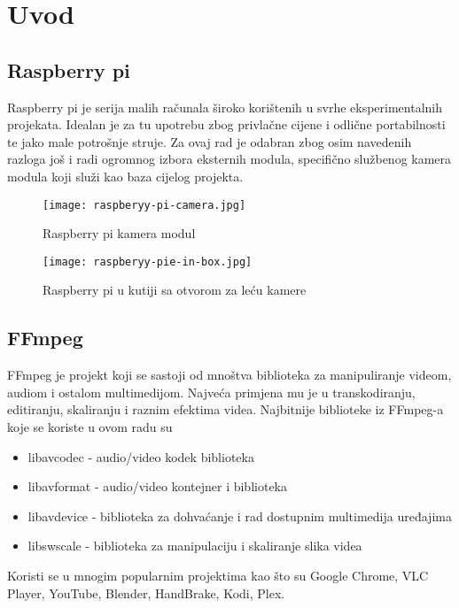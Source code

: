 \section{Uvod}
\subsection{Raspberry pi}
Raspberry pi je serija malih  
računala široko korištenih u svrhe eksperimentalnih projekata. \cite{rPiBook}
\paraBreak
Idealan je za tu upotrebu zbog privlačne cijene i odlične portabilnosti te jako male potrošnje struje.
\paraBreak
Za ovaj rad je odabran zbog osim navedenih razloga još i radi ogromnog izbora eksternih modula, specifično službenog kamera modula
koji služi kao baza cijelog projekta.

\begin{figure}[ht]
  \centering
  \texttt{[image: raspberyy-pi-camera.jpg]}
  \caption{Raspberry pi kamera modul}
\end{figure}

\begin{figure}[ht]
  \centering
  \texttt{[image: raspberyy-pie-in-box.jpg]}
  \caption{Raspberry pi u kutiji sa otvorom za leću kamere}
\end{figure}

\clearpage
\subsection{FFmpeg} \label{sec:ffmpeg}
FFmpeg je  projekt koji se sastoji od mnoštva biblioteka za manipuliranje videom, audiom i ostalom multimedijom.
\cite{ffmpegBook}
\paraBreak
Najveća primjena mu je u transkodiranju, editiranju, skaliranju i raznim efektima videa.
\paraBreak
Najbitnije biblioteke iz FFmpeg-a koje se koriste u ovom radu su \cite{ffmpegDocs}
\begin{itemize}
  \item libavcodec - audio/video kodek biblioteka
  \item libavformat - audio/video kontejner \hyperref[sct:mux]{} i \hyperref[sct:demux]{} biblioteka
  \item libavdevice - biblioteka za dohvaćanje i rad dostupnim multimedija uređajima
  \item libswscale - biblioteka za manipulaciju i skaliranje slika videa
\end{itemize}
Koristi se u mnogim popularnim projektima kao što su Google Chrome, VLC Player, YouTube, Blender, HandBrake, Kodi, Plex. \cite{ffmpegBook}

